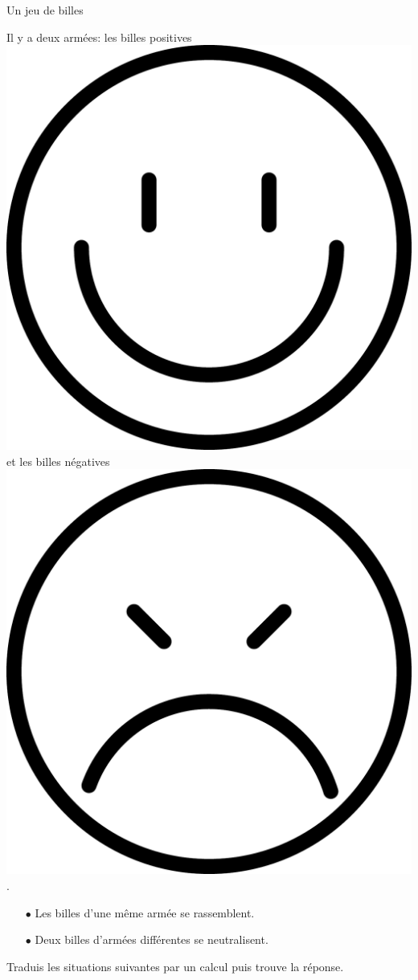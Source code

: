 \documentclass[a4paper,11pt]{report}
\begin{document}
\begin{resolu}{Un jeu de billes}
{
\newcommand{\bverte}{\includegraphics[scale=.04]{media/no-37/smileyHappy.pdf}}
\newcommand{\brouge}{\includegraphics[scale=.04]{media/no-37/smileyAngry.pdf}}
Il y a deux armées: les billes positives \bverte et les billes négatives \brouge .
\begin{itemize}
\item[$\bullet$] Les billes d'une  même armée se rassemblent.
\item[$\bullet$] Deux billes d'armées différentes se neutralisent.
\end{itemize}
\begin{tasks}
\task Traduis les situations suivantes par un calcul puis trouve la réponse.


\end{tasks}}
\end{resolu}
\end{document}
